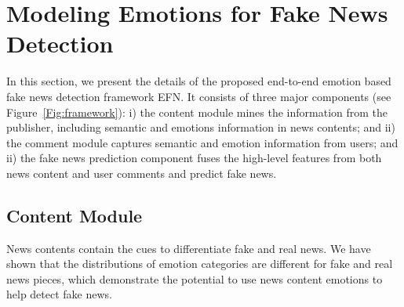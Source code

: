 \documentclass{article}
\newcommand{\m}{EFN}
\begin{document}
	\section{Modeling Emotions for Fake News Detection}
	
	In this section, we present the details of the proposed end-to-end emotion based fake news detection framework {\m}. It consists of three major components (see Figure~\ref{Fig:framework}): i) the content module mines the information from the publisher, including semantic and emotions information in news contents; and ii) the comment module captures semantic and emotion information from users; and ii) the fake news prediction component fuses the high-level features from both news content and user comments and predict fake news. 
	
	\subsection{Content  Module}
	News contents contain the cues to differentiate fake and real news. We have shown that the distributions of emotion categories are different for fake and real news pieces, which demonstrate the potential to use news content emotions to help detect fake news. 
	
	
\end{document}
